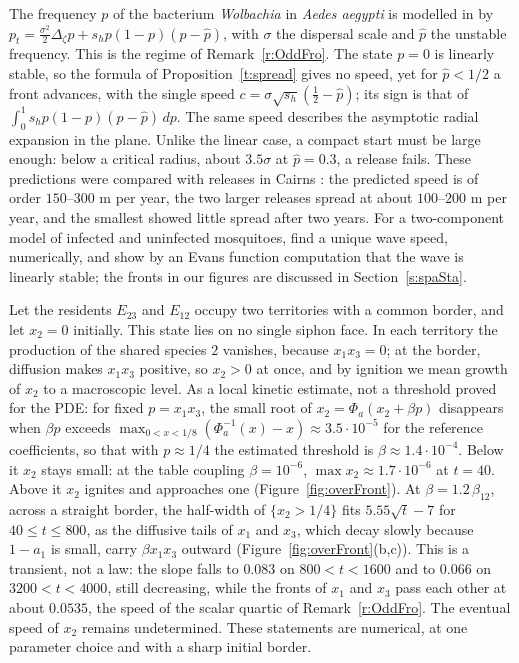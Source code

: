 The frequency $p$ of the bacterium \emph{Wolbachia} in \emph{Aedes aegypti} is modelled in \cite{TurelliBarton2017} by $p_t=\frac{\sigma^2}2\Delta_\zeta p+s_hp(1-p)(p-\hat p)$, with $\sigma$ the dispersal scale and $\hat p$ the unstable frequency. This is
the regime of Remark~\ref{r:OddFro}. The state $p=0$ is linearly stable, so the formula of Proposition~\ref{t:spread} gives no speed, yet for $\hat p<1/2$ a front advances, with the single speed $c=\sigma\sqrt{s_h}(\frac12-\hat p)$; its sign is that of
$\int_0^1s_hp(1-p)(p-\hat p)\,dp$. The same speed describes the asymptotic radial expansion in the plane. Unlike the linear case, a compact start must be large enough: below a critical radius, about $3.5\sigma$ at $\hat p=0.3$, a release fails. These predictions were compared with
releases in Cairns \cite{SchmidtEtAl2017}: the predicted speed is of order $150$--$300$ m per year, the two larger releases spread at about $100$--$200$ m per year, and the smallest showed little spread after two years. For a two-component model of infected and uninfected mosquitoes, \cite{ChanKimMarangell2016} find a unique wave speed, numerically, and show by an Evans function computation that the wave is linearly stable; the fronts in our figures are discussed in Section~\ref{s:spaSta}.
\eeR

Let the residents $E_{23}$ and $E_{12}$ occupy two territories with a common border, and let $x_2=0$ initially. This state lies on no single siphon face. In each territory the production of the shared species $2$ vanishes, because $x_1x_3=0$; at the
border, diffusion makes $x_1x_3$ positive, so $x_2>0$ at once, and by ignition we mean growth of $x_2$ to a macroscopic level. As a local kinetic estimate, not a threshold proved for the PDE: for fixed $p=x_1x_3$, the small root of $x_2=\Phi_a(x_2+\beta p)$ disappears when $\beta p$ exceeds $\max_{0<x<1/8}(\Phi_a^{-1}(x)-x)\approx3.5\cdot10^{-5}$ for the reference coefficients,
so that with $p\approx1/4$ the estimated threshold is $\beta\approx1.4\cdot10^{-4}$. Below it $x_2$ stays small: at the table coupling $\beta=10^{-6}$, $\max x_2\approx1.7\cdot10^{-6}$ at $t=40$. Above it $x_2$ ignites and approaches one
(Figure~\ref{fig:overFront}). At $\beta=1.2\,\beta_{12}$, across a straight border, the half-width of $\{x_2>1/4\}$ fits $5.55\sqrt t-7$ for $40\le t\le800$, as the diffusive tails of $x_1$ and $x_3$, which decay slowly because $1-a_1$ is small, carry $\beta x_1x_3$ outward (Figure~\ref{fig:overFront}(b,c)).
This is a transient, not a law: the slope falls to $0.083$ on $800<t<1600$ and to $0.066$ on $3200<t<4000$, still decreasing, while the fronts of $x_1$ and $x_3$ pass each other at about $0.0535$, the speed of the scalar quartic of Remark~\ref{r:OddFro}. The eventual speed of $x_2$ remains undetermined. These statements are numerical, at one parameter choice and with a sharp initial border.
\eeR

